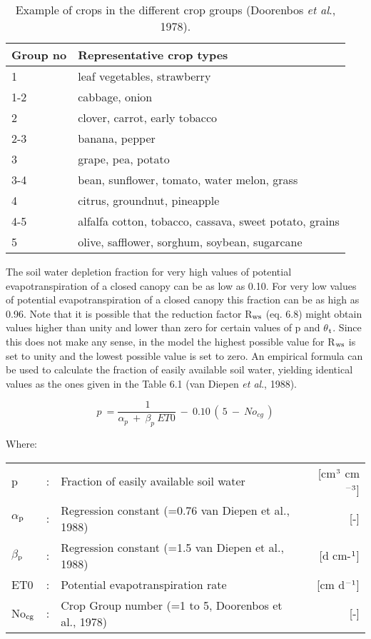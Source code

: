 \begin{table}
\caption{Example of crops in the different crop groups (Doorenbos {\it et al\/}., 1978).}
\label{tbl:ExampleCropGroups}
\begin{tabularx}{\textwidth}{lX}
\hline
Group no & Representative crop types\\
\hline
1 & leaf vegetables, strawberry\\     
1-2 & cabbage, onion\\
2 & clover, carrot, early tobacco\\     
2-3 & banana, pepper\\
3 & grape, pea, potato\\
3-4 & bean, sunflower, tomato, water melon, grass\\
4 & citrus, groundnut, pineapple\\
4-5 & alfalfa cotton, tobacco, cassava, sweet potato, grains\\
5 & olive, safflower, sorghum, soybean, sugarcane\\
\hline
\end{tabularx}
\end{table}

The soil water depletion fraction for very high values of potential evapotranspir\-ation of a
closed canopy can be as low as 0.10. For very low values of potential evapotranspiration
of a closed canopy this fraction can be as high as 0.96.
Note that it is possible that the reduction factor R$_{{\rm ws}}$ (eq. 6.8) might obtain values higher
than unity and lower than zero for certain values of p and $\theta$$_{{\rm t}}$. Since this does not make
any sense, in the model the highest possible value for R$_{{\rm ws}}$ is set to unity and the lowest
possible value is set to zero.
An empirical formula can be used to calculate the fraction of easily available soil water,
yielding identical values as the ones given in the Table 6.1 (van Diepen {\it et al\/}., 1988).

\begin{equation}
p~={\frac{~1}{ \alpha _{p} ~+~ \beta _{p} ~ET0}} ~-~ 0.10\, (\, 5~-~No _{cg} \, )
\end{equation}

Where:\\[5pt]
\begin{tabularx}{\textwidth}{llXr}
p &:& Fraction of easily available soil water  & [cm$^{{\rm 3}}$ cm$^{{\rm -3}}$]\\
$\alpha$$_{{\rm p}}$ &:& Regression constant {\small (=0.76 van Diepen et al., 1988)}  & [-]\\
$\beta$$_{{\rm p}}$ &:& Regression constant {\small (=1.5 van Diepen et al., 1988)}  & [d cm-$^{{\rm 1}}$]\\
ET0 &:& Potential evapotranspiration rate  & [cm d$^{{\rm -1}}$]\\
No$_{{\rm cg}}$ &:& Crop Group number {\small (=1 to 5, Doorenbos et al., 1978)}  & [-]\\
\end{tabularx}
 
